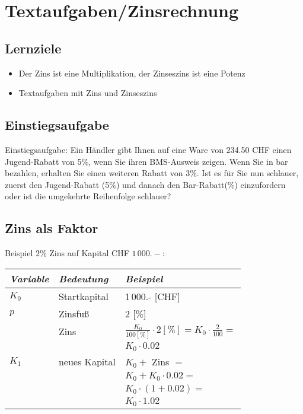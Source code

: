 
\newpage
\section{Textaufgaben/Zinsrechnung}
\subsection*{Lernziele}

\begin{itemize}
  \item Der Zins ist eine  Multiplikation, der Zinseszins ist eine Potenz
\item Textaufgaben mit Zins und Zinseszins
\end{itemize}

\subsection{Einstiegsaufgabe}
Einstiegsaufgabe:
Ein Händler gibt Ihnen auf eine Ware von 234.50 CHF einen Jugend-Rabatt von
5\%, wenn Sie ihren BMS-Ausweis zeigen. Wenn Sie in bar bezahlen, erhalten Sie
einen weiteren Rabatt von 3\%. Ist es für Sie nun schlauer, zuerst den
Jugend-Rabatt (5\%) und danach den Bar-Rabatt(\%) einzufordern oder
ist die umgekehrte Reihenfolge schlauer? 
\newpage



\subsection{Zins als Faktor}
Beispiel $2\%$ Zins auf Kapital CHF $1\,000.-$:\\

\begin{tabular}{l|l|l}
  \textit{Variable}  &   \textit{Bedeutung}   & \textit{Beispiel}\\%
\hline%
 $K_0$  & Startkapital & 1\,000.-  [CHF]\\\hline

 $p$    & Zinsfuß       & 2  [\%]\\\hline

        & Zins          & $\frac{K_0}{100[\%]}\cdot{}2[\%] =
                           K_0 \cdot{} \frac2{100} = $\\
        &               & $K_0\cdot 0.02$ \\\hline

$K_1$   & neues Kapital &   $K_0+$ Zins $=$ \\
        &               &   $K_0+K_0\cdot{}0.02 = $ \\
        &               &   $K_0\cdot(1+0.02) = $\\
        &               &   $K_0\cdot{}1.02$\\
\end{tabular}

